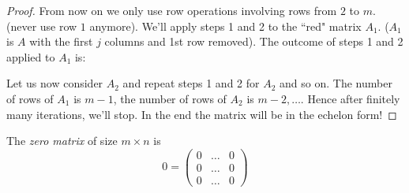 \documentclass[10pt]{scrartcl}
\begin{document}
\begin{proof}
From now on we only use row operations involving rows from $2$ to $m$. (never use row $1$ anymore). We'll apply steps 1 and 2 to the ``red" matrix $A_1$. ($A_1$ is $A$ with the first $j$ columns and 1st row removed). The outcome of  steps 1 and 2 applied to $A_1$ is:

 \begin{center}
    \end{center}


Let us now consider $A_2$ and repeat steps 1 and 2 for $A_2$ and so on. The number of rows of $A_1$ is $m-1$, the number of rows of $A_2$ is $m-2,\dots$. Hence after finitely many iterations, we'll stop. In the end the matrix will be in the echelon form!
\end{proof}




\begin{definition}
The \emph{zero matrix} of size $m \times n$ is 
\[0 = \begin{pmatrix}
 0 & \dots & 0\\
 0 & \dots & 0\\
 0 & \dots & 0	
 \end{pmatrix}
\]
\end{definition}
\end{document}
